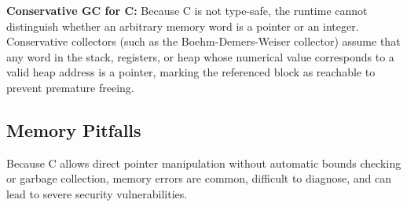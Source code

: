 \begin{remark}
    \textbf{Conservative GC for C:} Because C is not type-safe, the runtime cannot distinguish whether an arbitrary memory word is a pointer or an integer. Conservative collectors (such as the Boehm-Demers-Weiser collector) assume that any word in the stack, registers, or heap whose numerical value corresponds to a valid heap address is a pointer, marking the referenced block as reachable to prevent premature freeing.
\end{remark}

\subsection{Memory Pitfalls}

\begin{remark}
    Because C allows direct pointer manipulation without automatic bounds checking or garbage collection, memory errors are common, difficult to diagnose, and can lead to severe security vulnerabilities.
\end{remark}


